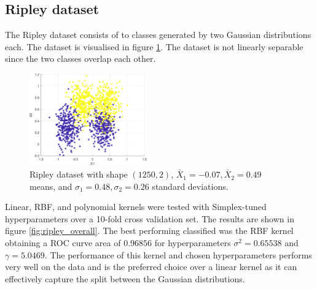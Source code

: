 \documentclass{article}
\begin{document}
    \subsection{Ripley dataset} 
        The Ripley dataset consists of to classes generated by two Gaussian distributions each. The dataset is visualised in figure \ref{fig:ripley_two_gaussians}. The dataset is not linearly separable since the two classes overlap each other. 
        \begin{figure}[H]
            \centering
            \includegraphics[width=0.450\textwidth]{Assignment 1/figures/ripley_data.pdf}
            \caption{Ripley dataset with shape $(1250,2)$, $\bar{X}_1=-0.07, \bar{X}_2=0.49$ means, and $ \sigma_1=0.48, \sigma_2=0.26$ standard deviations. }
            \label{fig:ripley_two_gaussians}
        \end{figure}
        
        Linear, RBF, and polynomial kernels were tested with Simplex-tuned hyperparameters over a  10-fold cross validation set. The results are shown in figure \ref{fig:ripley_overall}. The best performing classified was the RBF kernel obtaining a ROC curve area of $0.96856$ for hyperparameters $\sigma^2 = 0.65538$ and $\gamma=5.0469$. The performance of this kernel and chosen hyperparameters performs very well on the data and is the preferred choice over a linear kernel as it can effectively capture the split between the Gaussian distributions.  
        
\end{document}
